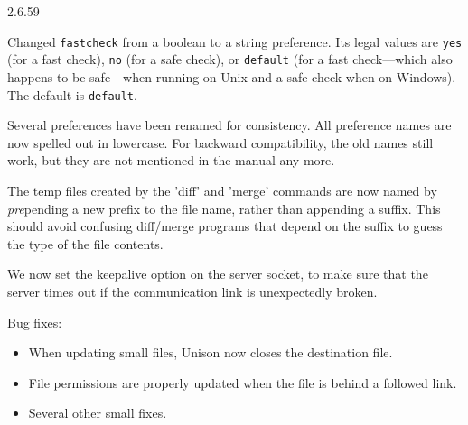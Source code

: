 \begin{changesfromversion}{2.6.59}
\item Changed \verb|fastcheck| from a boolean to a string preference.  Its
  legal values are \verb|yes| (for a fast check), \verb|no| (for a safe
  check), or \verb|default| (for a fast check---which also happens to be
  safe---when running on Unix and a safe check when on Windows).  The default
  is \verb|default|.
  \item Several preferences have been renamed for consistency.  All
  preference names are now spelled out in lowercase.  For backward
  compatibility, the old names still work, but they are not mentioned in
  the manual any more.
\item The temp files created by the 'diff' and 'merge' commands are now
   named by {\em pre}pending a new prefix to the file name, rather than
   appending a suffix.  This should avoid confusing diff/merge programs
   that depend on the suffix  to guess the type of the file contents.
\item We now set the keepalive option on the server socket, to make sure
  that the server times out if the communication link is unexpectedly broken.
\item Bug fixes:
\begin{itemize}
\item When updating small files, Unison now closes the destination file.
\item File permissions are properly updated when the file is behind a
  followed link.
\item Several other small fixes.
\end{itemize}
\end{changesfromversion}


